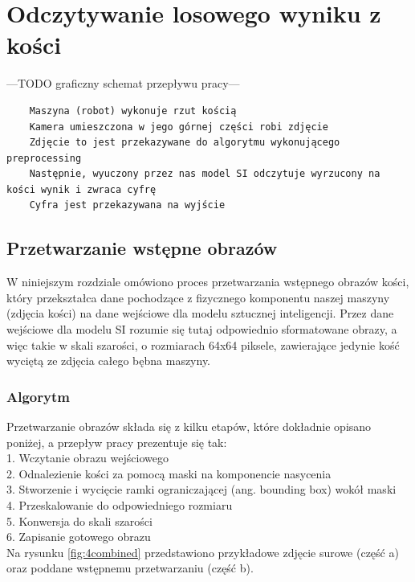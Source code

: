 \chapter{Odczytywanie losowego wyniku z kości}

---TODO graficzny schemat przepływu pracy---
\begin{verbatim}
    Maszyna (robot) wykonuje rzut kością
    Kamera umieszczona w jego górnej części robi zdjęcie
    Zdjęcie to jest przekazywane do algorytmu wykonującego preprocessing
    Następnie, wyuczony przez nas model SI odczytuje wyrzucony na kości wynik i zwraca cyfrę
    Cyfra jest przekazywana na wyjście
\end{verbatim}

\section{Przetwarzanie wstępne obrazów}

W niniejszym rozdziale omówiono proces przetwarzania wstępnego obrazów kości,
który przekształca dane pochodzące z fizycznego komponentu naszej maszyny (zdjęcia kości) na dane wejściowe dla modelu sztucznej inteligencji.
Przez dane wejściowe dla modelu SI rozumie się tutaj odpowiednio sformatowane obrazy, a więc takie w skali szarości,
o rozmiarach 64x64 piksele, zawierające jedynie kość wyciętą ze zdjęcia całego bębna maszyny.

\subsection{Algorytm}

Przetwarzanie obrazów składa się z kilku etapów, które dokładnie opisano poniżej, a przepływ pracy prezentuje się tak: \\
1. Wczytanie obrazu wejściowego \\
2. Odnalezienie kości za pomocą maski na komponencie nasycenia \\
3. Stworzenie i wycięcie ramki ograniczającej (ang. bounding box) wokół maski \\
4. Przeskalowanie do odpowiedniego rozmiaru \\
5. Konwersja do skali szarości \\
6. Zapisanie gotowego obrazu \\

Na rysunku \ref{fig:4combined} przedstawiono przykładowe zdjęcie surowe (część a)
oraz poddane wstępnemu przetwarzaniu (część b).


